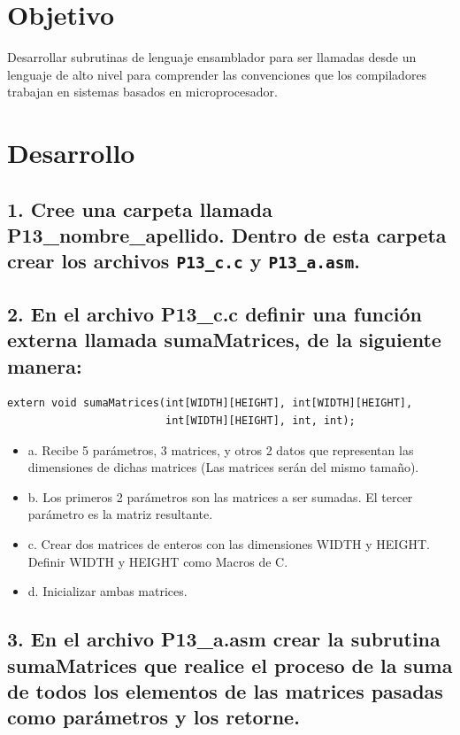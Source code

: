 \documentclass[10pt]{article}
\begin{document}
\section*{Objetivo}
\label{sec:org58bfd2f}

Desarrollar subrutinas de lenguaje ensamblador para ser llamadas desde un lenguaje de alto nivel para comprender las convenciones que los compiladores trabajan en sistemas basados en microprocesador.

\section*{Desarrollo}
\label{sec:org171a129}
\subsection*{1. Cree una carpeta llamada P13\_nombre\_apellido. Dentro de esta carpeta crear los archivos \texttt{P13\_c.c} y \texttt{P13\_a.asm}.}
\label{sec:org6f4439c}


\subsection*{2. En el archivo P13\_c.c definir una función externa llamada sumaMatrices, de la siguiente manera:}
\label{sec:org3b44888}

\begin{verbatim}
extern void sumaMatrices(int[WIDTH][HEIGHT], int[WIDTH][HEIGHT],
                         int[WIDTH][HEIGHT], int, int);
\end{verbatim}

\begin{itemize}
\item a. Recibe 5 parámetros, 3 matrices, y otros 2 datos que representan las dimensiones de dichas matrices (Las matrices serán del mismo tamaño).

\item b. Los primeros 2 parámetros son las matrices a ser sumadas. El tercer parámetro es la matriz resultante.

\item c. Crear dos matrices de enteros con las dimensiones WIDTH y HEIGHT. Definir WIDTH y HEIGHT como Macros de C.

\item d. Inicializar ambas matrices.
\end{itemize}


\subsection*{3. En el archivo P13\_a.asm crear la subrutina sumaMatrices que realice el proceso de la suma de todos los elementos de las matrices pasadas como parámetros y los retorne.}
\label{sec:org6af8962}
\end{document}
